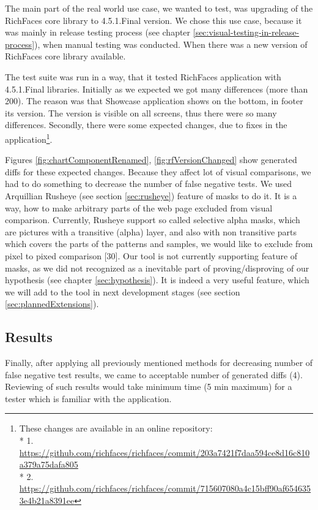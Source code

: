 \documentclass[11pt,oneside,final]{fithesis2}
\begin{document}
  The main part of the real world use case, we wanted to test, was upgrading of the RichFaces core library to 4.5.1.Final version.
  We chose this use case, because it was mainly in release testing process (see chapter \ref{sec:visual-testing-in-release-process}),
  when manual testing was conducted. When there was a new version of RichFaces core library available.
  
  The test suite was run in a way, that it tested RichFaces application with 4.5.1.Final libraries. Initially as we expected we
  got many differences (more than 200). The reason was that Showcase application shows on the bottom, in footer its version. 
  The version is visible on all screens, thus there were so many differences. Secondly, there were some expected changes, due to
  fixes in the application\footnote{These changes are available in an online repository:\\*
  1. \url{https://github.com/richfaces/richfaces/commit/203a7421f7daa594ce8d16c810a379a75dafa805}\\* 
  2. \url{https://github.com/richfaces/richfaces/commit/715607080a4c15bff90af6546353e4b21a8391ee}}.
  
  Figures \ref{fig:chartComponentRenamed}, \ref{fig:rfVersionChanged} show generated diffs for these expected changes. Because they
  affect lot of visual comparisons, we had to do something to decrease the number of false negative tests. We used Arquillian Rusheye 
  (see section \ref{sec:rusheye}) feature of masks to do it. It is a way, how to make arbitrary parts of the web page excluded from
  visual comparison. Currently, Rusheye support so called selective alpha masks, which are pictures with a transitive (alpha) layer,
  and also with non transitive parts which covers the parts of the patterns and samples, we would like to exclude from pixel to
  pixed comparison [30]. Our tool is not currently supporting feature of masks, as we did not recognized as a inevitable part of
  proving/disproving of our hypothesis (see chapter \ref{sec:hypothesis}). It is indeed a very useful feature, which we will
  add to the tool in next development stages (see section \ref{sec:plannedExtensions}).
  
  \subsection{Results}
  
  Finally, after applying all previously mentioned methods for decreasing number of false negative test results, we came to acceptable
  number of generated diffs (4). Reviewing of such results would take minimum time (5 min maximum) for a tester which is familiar with the application.
  
\end{document}
